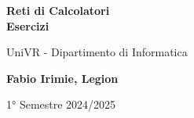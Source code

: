 \begin{titlepage}
	\begin{center}
		\vspace*{1cm}

		\Huge
		\textbf{Reti di Calcolatori\\Esercizi}

		\vspace{0.5cm}
		\LARGE
		UniVR - Dipartimento di Informatica

		\vspace{1.5cm}

		\textbf{Fabio Irimie, Legion}

		\vfill


		\vspace{0.8cm}


		1° Semestre 2024/2025

	\end{center}
\end{titlepage}
